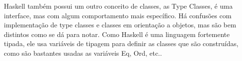 \documentclass{article}
\begin{document}
    Haskell também possui um outro conceito de classes, as Type Classes, é uma interface, mas com algum comportamento mais específico. Há confusões com implementação de type classes e classes em orientação a objetos, mas são bem distintos como se dá para notar. Como Haskell é uma linguagem fortemente tipada, ele usa variáveis de tipagem para definir as classes que são construídas, como são bastantes usadas as variáveis Eq, Ord, etc..
\end{document}
